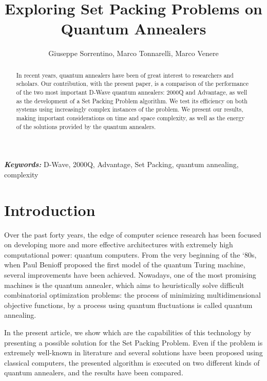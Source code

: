 \documentclass[oneside,a4paper]{article}
\title{Exploring Set Packing Problems on Quantum Annealers}
\author{Giuseppe Sorrentino, Marco Tonnarelli, Marco Venere}
\affil{Politecnico di Milano\\
Milan, Italy\\
\href{mailto:first.last@polimi.it}{{ giuseppe.sorrentino@mail.polimi.it\\}{marco.tonnarelli@mail.polimi.it\\} {marco.venere@mail.polimi.it} }}
\date{}
\providecommand{\keywords}[1]{\textbf{\textit{Keywords:}} #1}
\begin{document}
\maketitle
\begin{abstract}
In recent years, quantum annealers have been of great interest to researchers and scholars. Our contribution, with the present paper, is a comparison of the performance of the two most important D-Wave quantum annealers: 2000Q and Advantage, as well as the development of a Set Packing Problem algorithm. We test its efficiency on both systems using increasingly complex instances of the problem. We present our results, making important considerations on time and space complexity, as well as the energy of the solutions provided by the quantum annealers.
\end{abstract}

\keywords{D-Wave, 2000Q, Advantage, Set Packing, quantum annealing, complexity}

\section{Introduction}
Over the past forty years, the edge of computer science research has been focused on developing more and more effective architectures with extremely high computational power: quantum computers. From the very beginning of the ‘80s, when Paul Benioff proposed the first model of the quantum Turing machine, several improvements have been achieved. Nowadays, one of the most promising machines is the quantum annealer, which aims to heuristically solve difficult combinatorial optimization problems\cite{WebSite3}: the process of minimizing multidimensional objective functions, by a process using quantum fluctuations is called quantum annealing.

In the present article, we show which are the capabilities of this technology by presenting a possible solution for the Set Packing Problem. Even if the problem is extremely well-known in literature and several solutions have been proposed using classical computers, the presented algorithm is executed on two different kinds of quantum annealers, and the results have been compared.
\end{document}
